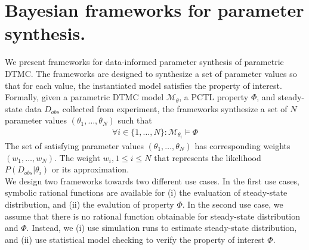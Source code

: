 \chapter{Bayesian frameworks for parameter synthesis.}
We present frameworks for data-informed parameter synthesis of parametric DTMC. The frameworks are
designed to synthesize a set of parameter values so that for each value, the instantiated model
satisfies the property of interest. Formally, given a parametric DTMC model $\mathcal{M}_\theta$, a
PCTL property $\Phi$, and steady-state data $D_{obs}$ collected from experiment, the frameworks
synthesize a set of $N$ parameter values $(\theta_1,\ldots,\theta_N)$ such that
\begin{align*}
    \forall i \in \{1,\ldots,N\}: \mathcal{M}_{\theta_i} \models \Phi
\end{align*}
The set of satisfying parameter values $(\theta_1,\ldots,\theta_N)$ has corresponding weights
$(w_1,\ldots,w_N)$. The weight $w_i, 1\leq i\leq N$ that represents the likelihood
$P(D_{obs}|\theta_i)$ or its approximation.\\
We design two frameworks towards two different use cases. In the first use cases, symbolic rational
functions are available for (i) the evaluation of steady-state distribution, and (ii) the evalution
of property $\Phi$. In the second use case, we assume that there is no rational function obtainable
for steady-state distribution and $\Phi$. Instead, we (i) use simulation runs to estimate
steady-state distribution, and (ii) use statistical model checking to verify the property of
interest $\Phi$.

\newpage
